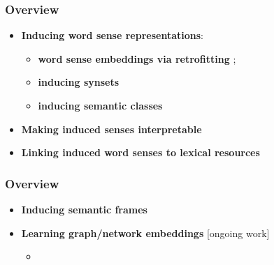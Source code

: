 \begin{frame}
  \frametitle{Overview}

  \begin{itemize}
		\item \alert{\textbf{Inducing word sense representations}}:
		\begin{itemize}
		\item \textbf{word sense embeddings via retrofitting} \cite{pelevina-EtAl:2016:RepL4NLP,remus:2018};
		\item \textbf{inducing synsets}~\cite{ustalov-panchenko-biemann:2017:Long,ustalov2017fighting,madoc43362}
		\item \textbf{inducing semantic classes} \cite{panchenko:2018:SemanticClasses} 
				
		\end{itemize}

	
	\pause 
	\vspace{1em}
	\item \alert{\textbf{Making induced senses interpretable}} \cite{panchenko-EtAl:2017:EMNLP2017Demos,panchenko-EtAl:2017:EACLlong}
	
	\pause
	\vspace{1em}
	\item \alert{\textbf{Linking induced word senses to lexical resources}}~\cite{panchenko2016best,faralli2016linked,panchenko-EtAl:2017:SENSE2017,biemann2018framework}	
			
\end{itemize}
	
\end{frame}


\begin{frame}
  \frametitle{Overview}

  \begin{itemize}
		\item \alert{\textbf{Inducing semantic frames}} \cite{ustalov2018unsupervised}
		
		\item \alert{\textbf{Learning graph/network embeddings}} [ongoing work]
		\begin{itemize}
		\item 
		\end{itemize}
		
		 
				
	
			
\end{itemize}
	
\end{frame}



